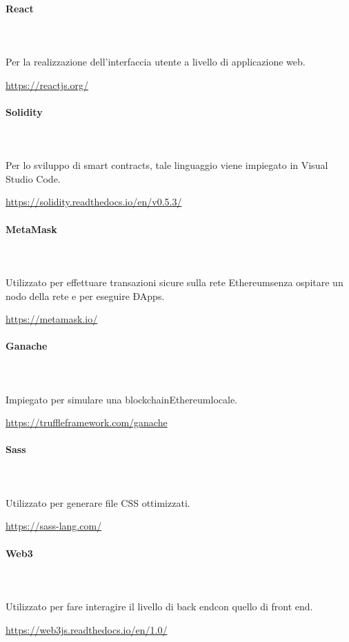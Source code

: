 		\paragraph{React} \mbox{}\\ \mbox{}\\ 
		Per la realizzazione dell'interfaccia utente a livello di applicazione web.\newline
		\centerline{\url{https://reactjs.org/}}
		
		\paragraph{Solidity} \mbox{}\\ \mbox{}\\ 
		Per lo sviluppo di smart contracts\glo, tale linguaggio viene impiegato in Visual Studio Code.\newline
		\centerline{\url{https://solidity.readthedocs.io/en/v0.5.3/}}
		
		\paragraph{MetaMask} \mbox{}\\ \mbox{}\\ 
		Utilizzato per effettuare transazioni sicure sulla rete Ethereum\glosp senza ospitare un nodo della rete e per eseguire ÐApps\glo. \newline
		\centerline{\url{https://metamask.io/}}
		
		\paragraph{Ganache} \mbox{}\\ \mbox{}\\
		Impiegato per simulare una blockchain\glosp Ethereum\glosp locale.\\
		\centerline{\url{https://truffleframework.com/ganache}}
		
		\paragraph{Sass} \mbox{}\\ \mbox{}\\
		Utilizzato per generare file CSS ottimizzati.\\
		\centerline{\url{https://sass-lang.com/}}
		
		\paragraph{Web3} \mbox{}\\ \mbox{}\\
		Utilizzato per fare interagire il livello di back end\glosp con quello di front end\glo. \\
		\centerline{\url{https://web3js.readthedocs.io/en/1.0/}}
		
